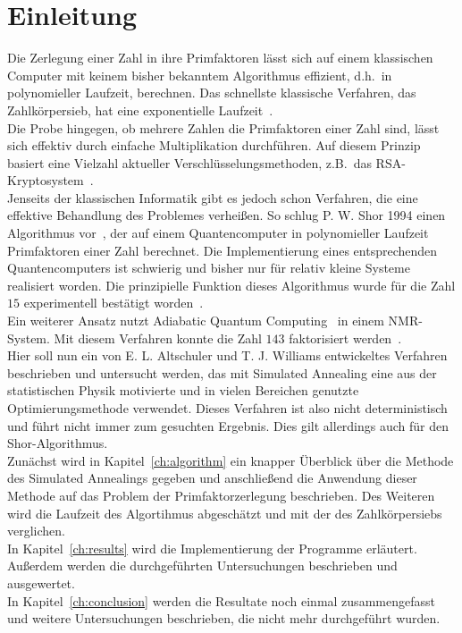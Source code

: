 \chapter{Einleitung}
\setcounter{page}{1}
Die Zerlegung einer Zahl in ihre Primfaktoren lässt sich auf einem klassischen Computer mit keinem bisher bekanntem Algorithmus effizient, d.h.\ in polynomieller Laufzeit, berechnen. Das schnellste klassische Verfahren, das Zahlkörpersieb, hat eine exponentielle Laufzeit~\parencite{pomerance}.\\
Die Probe hingegen, ob mehrere Zahlen die Primfaktoren einer Zahl sind, lässt sich effektiv durch einfache Multiplikation durchführen. Auf diesem Prinzip basiert eine Vielzahl aktueller Verschlüsselungsmethoden, z.B.\ das RSA-Kryptosystem~\parencite{rsa}. \\
Jenseits der klassischen Informatik gibt es jedoch schon Verfahren, die eine effektive Behandlung des Problemes verheißen. So schlug P. W. Shor 1994 einen Algorithmus vor~\parencite{shor}, der auf einem Quantencomputer in polynomieller Laufzeit Primfaktoren einer Zahl berechnet. Die Implementierung eines entsprechenden Quantencomputers ist schwierig und bisher nur für relativ kleine Systeme realisiert worden. Die prinzipielle Funktion dieses Algorithmus wurde für die Zahl $15$ experimentell bestätigt worden~\parencite{vandersypen}.\\
Ein weiterer Ansatz nutzt Adiabatic Quantum Computing~\parencite{suter} in einem NMR-System. Mit diesem Verfahren konnte die Zahl $143$ faktorisiert werden~\parencite{xu}. \\
Hier soll nun ein von E. L. Altschuler und T. J. Williams entwickeltes Verfahren~\parencite{altschuler} beschrieben und untersucht werden, das mit Simulated Annealing eine aus der statistischen Physik motivierte und in vielen Bereichen genutzte Optimierungsmethode verwendet. Dieses Verfahren ist also nicht deterministisch und führt nicht immer zum gesuchten Ergebnis. Dies gilt allerdings auch für den Shor-Algorithmus.\\
Zunächst wird in Kapitel~\ref{ch:algorithm} ein knapper Überblick über die Methode des Simulated Annealings gegeben und anschließend die Anwendung dieser Methode auf das Problem der Primfaktorzerlegung beschrieben. Des Weiteren wird die Laufzeit des Algortihmus abgeschätzt und mit der des Zahlkörpersiebs verglichen.\\
In Kapitel~\ref{ch:results} wird die Implementierung der Programme erläutert. Außerdem werden die durchgeführten Untersuchungen beschrieben und ausgewertet.\\
In Kapitel~\ref{ch:conclusion} werden die Resultate noch einmal zusammengefasst und weitere Untersuchungen beschrieben, die nicht mehr durchgeführt wurden.
